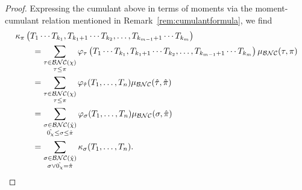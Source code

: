 \begin{proof}
	Expressing the cumulant above in terms of moments via the moment-cumulant relation mentioned in Remark~\ref{rem:cumulantformula}, we find
	\begin{align*}
		&\kappa_\pi\left(T_1\cdots T_{k_1}, T_{k_1+1} \cdots T_{k_2}, \ldots, T_{k_{m-1}+1}\cdots T_{k_m}\right) \\
		&\qquad= \sum_{\substack{\tau\in\mathcal{BNC}(\chi)\\\tau\leq\pi}} \varphi_\tau\left(T_1\cdots T_{k_1}, T_{k_1+1} \cdots T_{k_2}, \ldots, T_{k_{m-1}+1}\cdots T_{k_m}\right) \mu_{\mathcal{BNC}}(\tau, \pi) \\
		&\qquad= \sum_{\substack{\tau \in \mathcal{BNC}(\chi) \\ \tau\leq\pi}} \varphi_{\hat\tau}(T_1, \ldots, T_n)\mu_{\mathcal{BNC}}(\hat\tau, \hat\pi) \\
		&\qquad= \sum_{\substack{\sigma\in\mathcal{BNC}(\hat\chi) \\ \hat{0_\chi} \leq \sigma \leq \hat\pi}} \varphi_\sigma(T_1, \ldots, T_n) \mu_{\mathcal{BNC}}(\sigma, \hat\pi) \\
		&\qquad= \sum_{\substack{\sigma\in\mathcal{BNC}(\hat\chi) \\ \sigma\vee\hat{0_\chi} = \hat\pi}} \kappa_\sigma(T_1, \ldots, T_n).
	\end{align*}
\end{proof}


